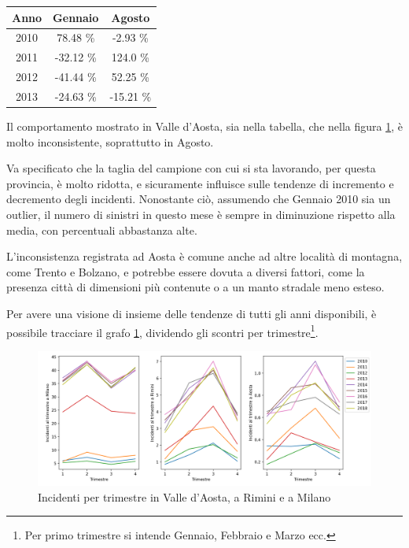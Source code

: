\documentclass[a4paper,12pt]{report}
\begin{document}
\begin{center}
    \def\arraystretch{1.5}%
    \begin{tabular}{ |c|c|c| } 
    \hline
    Anno & Gennaio & Agosto \\ 
    \hline
    \rowcolor{TableGray}
    2010 & 78.48 \%  & -2.93 \%\\ 
    2011 & -32.12 \% & 124.0 \%\\
    \rowcolor{TableGray}
    2012 & -41.44 \% & 52.25 \% \\
    2013 & -24.63 \% & -15.21 \% \\
    \hline
    \end{tabular}
\end{center}

Il comportamento mostrato in Valle d'Aosta, sia nella tabella, 
che nella figura \ref{fig:aosta-rimini-milano-trimestre}, è molto inconsistente, 
soprattutto in Agosto. 

Va specificato che la taglia del campione con cui si sta lavorando, per questa provincia, 
è molto ridotta, e sicuramente influisce sulle tendenze di incremento e decremento 
degli incidenti. 
Nonostante ciò, assumendo che Gennaio 2010 sia un outlier, il numero di sinistri in 
questo mese è sempre in diminuzione rispetto alla media, con percentuali abbastanza alte. 

L'inconsistenza registrata ad Aosta è comune anche ad altre località di montagna, come Trento e 
Bolzano, e potrebbe essere dovuta a diversi fattori, come la presenza città di 
dimensioni più contenute o a un manto stradale meno esteso. 

Per avere una visione di insieme delle tendenze di tutti gli anni disponibili, 
è possibile tracciare 
il grafo \ref{fig:aosta-rimini-milano-trimestre}, dividendo gli scontri 
per trimestre\footnote{Per primo trimestre si intende Gennaio, Febbraio e Marzo ecc.}. 

\begin{figure}
    \includegraphics[width=\linewidth]{../src/incidenti/incidenti_senza_coords/mese_incidenti/trimestri_aosta_milano_rimini.png}
    \caption{Incidenti per trimestre in Valle d'Aosta, a Rimini e a Milano}
    \label{fig:aosta-rimini-milano-trimestre}
\end{figure}
\end{document}
